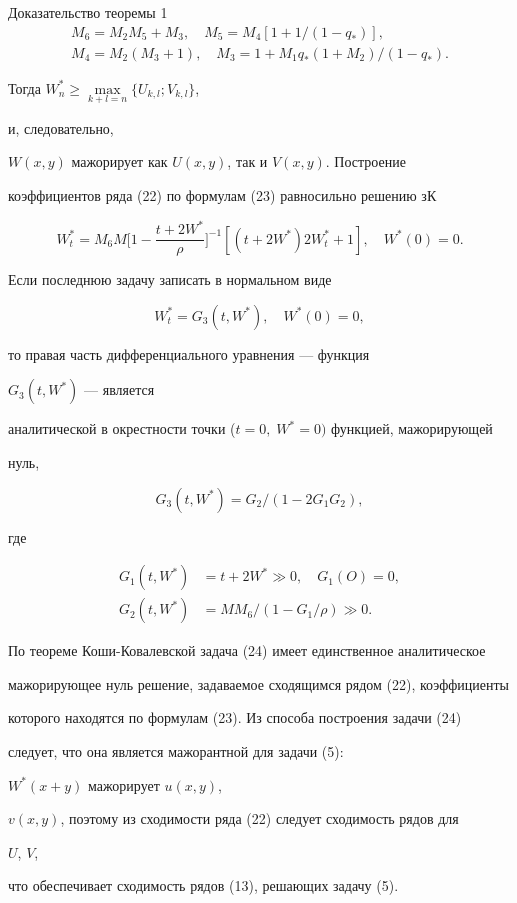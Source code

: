 \begin{pf*}{Доказательство теоремы 1}
\begin{gather*}
M_6=M_2M_5+M_3,\quad M_5=M_4[1+1/(1-q_*)],\\


M_4=M_2(M_3+1),\quad M_3=1+M_1q_*(1+M_2)/(1-q_*).


\end{gather*}


Тогда $W^*_n\ge\max\limits_{k+l=n}\{U_{k,l};V_{k,l}\}$,


и, следовательно,


$W(x,y)$ мажорирует как $U(x,y)$, так и $V(x,y)$. Построение


коэффициентов ряда (22) по формулам (23) равносильно решению зК


$$


W^*_t=M_6M\biggl[1-\frac{t+2W^*}{\rho}\biggr]^{-1}


[(t+2W^*)2W^*_t+1],\quad W^*(0)=0.


$$


Если последнюю задачу записать в нормальном виде


\begin{equation}


W^*_t=G_3(t,W^*),\quad W^*(0)=0,


\end{equation}


то правая часть дифференциального уравнения --- функция


$G_3(t,W^*)$ --- является


аналитической в окрестности точки ($t=0,\;W^*=0)$ функцией, мажорирующей


нуль,


$$


G_3(t,W^*)=G_2/(1-2G_1G_2),


$$


где


\begin{align*}


G_1(t,W^*)&=t+2W^*\gg 0,\quad G_1(O)=0,\\


G_2(t,W^*)&=MM_6/(1-G_1/\rho)\gg 0.


\end{align*}


По теореме Коши-Ковалевской задача (24) имеет единственное аналитическое


мажорирующее нуль решение, задаваемое сходящимся рядом (22), коэффициенты


которого находятся по формулам (23). Из способа построения задачи (24)


следует, что она является мажорантной для задачи (5):


$W^*(x+y)$ мажорирует $u(x,y)$,


$v(x,y)$, поэтому из сходимости ряда (22) следует сходимость рядов для


$U$, $V$,


что обеспечивает сходимость рядов (13), решающих задачу (5).


\end{pf*}





